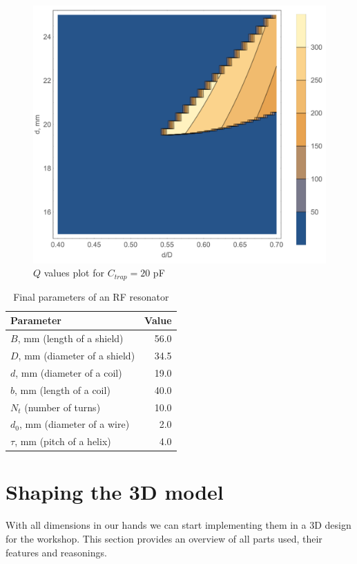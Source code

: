\begin{figure}[h!]
\centering
\includegraphics[width=.78\textwidth]{images/q_plot_siverns_tex_20}
\caption{$Q$ values plot for $C_{trap} = 20$ pF}
\label{fig:q_plot_20}
\end{figure}
\FloatBarrier
\begin{table}[h]
\centering
\begin{tabular}{| l | r |}
	\hline
	Parameter & Value\\
	\hline \hline
	$B$, mm (length of a shield) & 56.0 \\
	\hline
	$D$, mm (diameter of a shield) & 34.5 \\
	\hline
	$d$, mm (diameter of a coil) & 19.0 \\
	\hline
	$b$, mm (length of a coil) & 40.0 \\
	\hline
	$N_{t}$ (number of turns) & 10.0 \\
	\hline
	$d_0$, mm (diameter of a wire) & 2.0 \\
	\hline
	$\tau$, mm (pitch of a helix) & 4.0 \\
	\hline
\end{tabular}
\caption{Final parameters of an RF resonator}
\label{tbl:final_parameters}
\end{table}

\section{Shaping the 3D model}
With all dimensions in our hands we can start implementing them in a 3D design for the workshop. This section provides an overview of all parts used, their features and reasonings.

